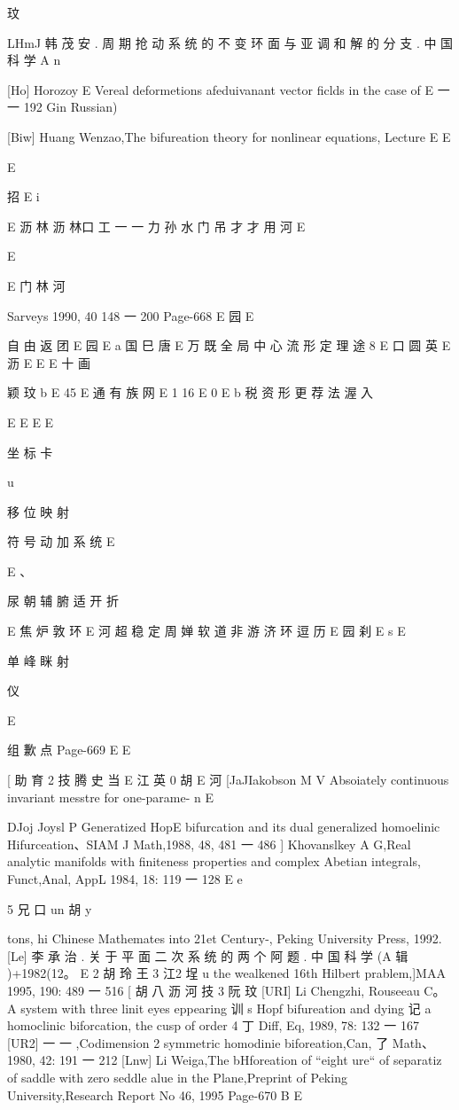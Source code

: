 玟

LHmJ 韩 茂 安 . 周 期 抢 动 系 统 的 不 变 环 面 与 亚 调 和 解 的 分 支 . 中 国 科 学 A
n

[Ho] Horozoy E Vereal deformetions afeduivanant vector ficlds in the case of
E 一
一 192 Gin Russian)

[Biw] Huang Wenzao,The bifureation theory for nonlinear equations, Lecture
E
E

E

招
E i

E 沥 林 沥 林口 工 一 一 力 孙 水 门 吊 才 才 用 河
E

E

E 门 林 河

Sarveys 1990, 40 148 一 200
Page-668
E 园 E

自 由 返 团 E 园 E
a 国 巳 唐
E 万 既
全 局 中 心 流 形 定 理 途 8
E 口 圆 英 E
沥 E E
E 十 画

颖 玟
b E 45
E 通 有 族 网
E 1 16
E 0 E
b 税 资 形
更 荐 法 渥 入

E E
E
E

坐 标 卡

u

移 位 映 射

符 号 动 加 系 统
E

E 、

尿 朝 辅 腑 适 开 折

E 焦 炉 敦
环 E
河 超 稳 定 周 婵 软 道
非 游 济 环 逗 历
E 园 刹
E s
E

单 峰 眯 射

仪

E

组 歉 点
Page-669
E E

[ 助 育 2 技
腾 史 当
E 江 英 0 胡
E
河
[JaJIakobson M V Absoiately continuous invariant messtre for one-parame-
n
E

DJoj Joysl P Generatized HopE bifurcation and its dual generalized homoelinic
Hifurceation、SIAM J Math,1988, 48, 481 一 486
] Khovanslkey A G,Real analytic manifolds with finiteness properties and
complex Abetian integrals, Funct,Anal, AppL 1984, 18: 119 一 128
E e

5 兄 口 un 胡 y

tons, hi Chinese Mathemates into 21et Century-, Peking University
Press, 1992.
[Le] 李 承 治 . 关 于 平 面 二 次 系 统 的 两 个 阿 题 . 中 国 科 学 (A 辑 )+1982(12。
E
2 胡 玲 王 3 江2 埕 u
the wealkened 16th Hilbert prablem,]MAA 1995, 190: 489 一 516
[ 胡 八 沥 河 技
3
阮
玟
[URI] Li Chengzhi, Rouseeau C。 A system with three linit eyes eppearing
训 s Hopf bifureation and dying 记 a homoclinic biforcation, the cusp of
order 4 丁 Diff, Eq, 1989, 78: 132 一 167
[UR2] 一 一 ,Codimension 2 symmetric homodinie biforeation,Can, 了
Math、 1980, 42: 191 一 212
[Lnw] Li Weiga,The bHforeation of “eight ure“ of separatiz of saddle with
zero seddle alue in the Plane,Preprint of Peking University,Research
Report No 46, 1995
Page-670
B E


